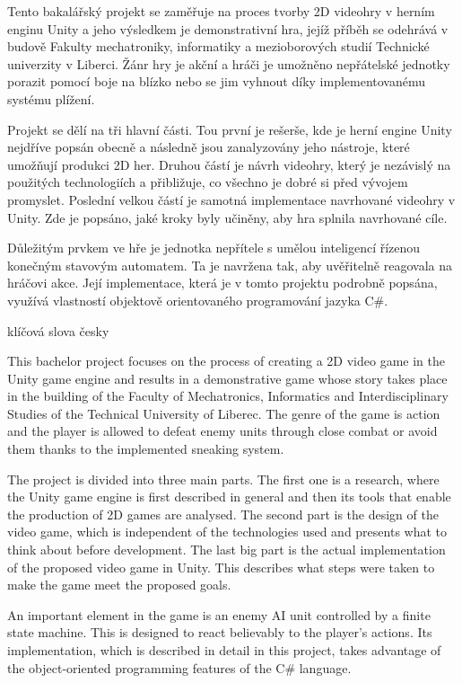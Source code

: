 \documentclass[FM,Proj]{tulthesis}
\begin{document}
	
	\begin{abstractCZ}
		Tento bakalářský projekt se zaměřuje na proces tvorby 2D videohry v herním enginu Unity a jeho výsledkem je demonstrativní hra, jejíž příběh se odehrává v budově Fakulty mechatroniky, informatiky a mezioborových studií Technické univerzity v Liberci. Žánr hry je akční a hráči je umožněno nepřátelské jednotky porazit pomocí boje na blízko nebo se jim vyhnout díky implementovanému systému plížení.
		
		Projekt se dělí na tři hlavní části. Tou první je rešerše, kde je herní engine Unity nejdříve popsán obecně a následně jsou zanalyzovány jeho nástroje, které umožňují produkci 2D her. Druhou částí je návrh videohry, který je nezávislý na použitých technologiích a přibližuje, co všechno je dobré si před vývojem promyslet. Poslední velkou částí je samotná implementace navrhované videohry v Unity. Zde je popsáno, jaké kroky byly učiněny, aby hra splnila navrhované cíle.
		
		Důležitým prvkem ve hře je jednotka nepřítele s umělou inteligencí řízenou konečným stavovým automatem. Ta je navržena tak, aby uvěřitelně reagovala na hráčovi akce. Její implementace, která je v tomto projektu podrobně popsána, využívá vlastností objektově orientovaného programování jazyka C\#.
	\end{abstractCZ}
	
	\begin{keywordsCZ}
		klíčová slova česky
	\end{keywordsCZ}
	\vspace{2cm}
	
	\begin{abstractEN}
		This bachelor project focuses on the process of creating a 2D video game in the Unity game engine and results in a demonstrative game whose story takes place in the building of the Faculty of Mechatronics, Informatics and Interdisciplinary Studies of the Technical University of Liberec. The genre of the game is action and the player is allowed to defeat enemy units through close combat or avoid them thanks to the implemented sneaking system.
		
		The project is divided into three main parts. The first one is a research, where the Unity game engine is first described in general and then its tools that enable the production of 2D games are analysed. The second part is the design of the video game, which is independent of the technologies used and presents what to think about before development. The last big part is the actual implementation of the proposed video game in Unity. This describes what steps were taken to make the game meet the proposed goals.
		
		An important element in the game is an enemy AI unit controlled by a finite state machine. This is designed to react believably to the player's actions. Its implementation, which is described in detail in this project, takes advantage of the object-oriented programming features of the C\# language.
	\end{abstractEN}
	
\end{document}
